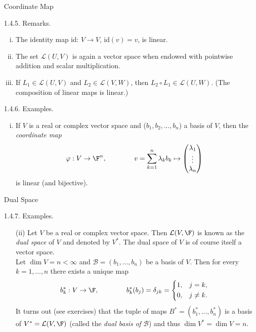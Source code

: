 \documentclass[smaller,hyperref={CJKbookmarks=true}]{beamer}
\newcommand{\myseries}[2]{$#1_1,#1_2,\dots,#1_#2$}
\begin{document}
\begin{frame}[c,shrink]{Coordinate Map}
\begin{spacing}{1.1}
\alert{1.4.5. Remarks.}
\begin{enumerate}[(i)]
  \item The identity map id: $V\to V$, id$(v)=v$, is linear.
  \item The set $\mathcal{L}(U,V)$ is again a vector space when endowed with pointwise addition and scalar multiplication.
  \item If $L_1\in\mathcal{L}(U,V)$ and $L_2\in\mathcal{L}(V,W)$, then $L_2\circ L_1\in\mathcal{L}(U,W)$. (The composition of linear maps is linear.)
\end{enumerate}
\vspace*{10pt}
\alert{1.4.6. Examples.}
\begin{enumerate}[(i)]
  \item If $V$ is a real or complex vector space and (\myseries{b}{n}) a basis of $V$, then the \emph{coordinate map}
      \[\varphi:V\to\F^n,\qquad\qquad v=\sum_{k=1}^{n}\lambda_kb_k\mapsto\begin{pmatrix}
                                           \lambda_1 \\
                                           \vdots\\
                                           \lambda_n
                                         \end{pmatrix}\]
      is linear (and bijective).
\end{enumerate}
\end{spacing}
\end{frame}
\begin{frame}[c,shrink]{Dual Space}
\begin{spacing}{1.1}
\alert{1.4.7. Examples.}
\begin{itemize}
  \item[(ii)] Let $V$ be a real or complex vector space. Then $\mathcal{L}(V,\F)$ is known as the \emph{dual space} of $V$ and denoted by $V^*$. The dual space of $V$ is of course itself a vector space.\\[9pt]
      Let $\dim V=n<\infty$ and $\mathcal{B}=(b_1,\ldots,b_n)$ be a basis of $V$. Then for every $k=1,\ldots,n$ there exists a unique map
      \[b_k^*:V\to\F,\qquad\qquad b_k^*(b_j)=\delta_{jk}=\left\{\begin{aligned}1,\quad &j=k,\\ 0,\quad &j\neq k.\end{aligned}\right.\]
      It turns out (see exercises) that the tuple of maps $B^*=(b_1^*,\ldots,b_n^*)$ is a basis of $V^*=\mathcal{L}(V,\F)$ (called the \emph{dual basis of} $\mathcal{B}$) and thus $\dim V^*=\dim V=n$.
\end{itemize}
\end{spacing}
\end{frame}
\end{document}
